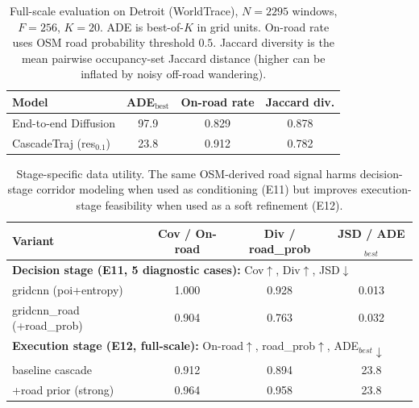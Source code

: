 \begin{table}[t]
  \centering
  \small
  \begin{tabular}{lccc}
    \toprule
    Model & ADE$_{\text{best}}$ & On-road rate & Jaccard div. \\
    \midrule
    End-to-end Diffusion & 97.9 & 0.829 & 0.878 \\
    CascadeTraj (res$_{0.1}$) & 23.8 & 0.912 & 0.782 \\
    \bottomrule
  \end{tabular}
  \caption{Full-scale evaluation on Detroit (WorldTrace), $N=2295$ windows, $F=256$, $K=20$. ADE is best-of-$K$ in grid units. On-road rate uses OSM road probability threshold $0.5$. Jaccard diversity is the mean pairwise occupancy-set Jaccard distance (higher can be inflated by noisy off-road wandering).}
  \label{tab:fullscale}
\end{table}

\begin{table}[t]
  \centering
  \small
  \begin{tabular}{lccc}
    \toprule
    Variant & Cov / On-road & Div / road\_prob & JSD / ADE$_{best}$ \\
    \midrule
    \multicolumn{4}{l}{\textbf{Decision stage (E11, 5 diagnostic cases):} Cov$\uparrow$, Div$\uparrow$, JSD$\downarrow$} \\
    gridcnn (poi+entropy) & 1.000 & 0.928 & 0.013 \\
    gridcnn\_road (+road\_prob) & 0.904 & 0.763 & 0.032 \\
    \midrule
    \multicolumn{4}{l}{\textbf{Execution stage (E12, full-scale):} On-road$\uparrow$, road\_prob$\uparrow$, ADE$_{best}\downarrow$} \\
    baseline cascade & 0.912 & 0.894 & 23.8 \\
    +road prior (strong) & 0.964 & 0.958 & 23.8 \\
    \bottomrule
  \end{tabular}
  \caption{Stage-specific data utility. The same OSM-derived road signal harms decision-stage corridor modeling when used as conditioning (E11) but improves execution-stage feasibility when used as a soft refinement (E12).}
  \label{tab:stage-specific}
\end{table}
